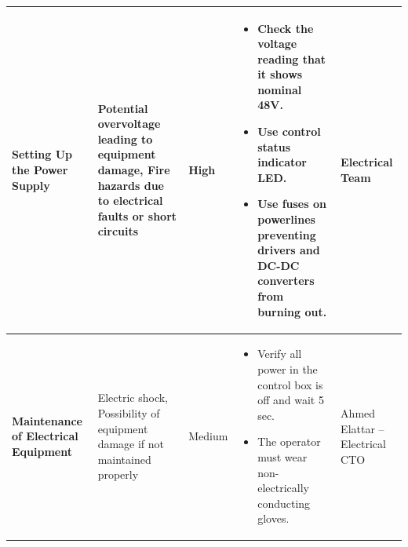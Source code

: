 \documentclass[conference , 12pt]{IEEEtran}
\begin{document}
\begin{longtable}{|p{3.5cm}|>{\raggedright}p{3.5cm}|p{1.5cm}|>{\raggedright}p{5cm}|p{3cm}|}
    \hline
    \textbf{Setting Up the Power Supply}                                                                                                                                           &
    Potential overvoltage leading to equipment damage, Fire hazards due to electrical faults or short circuits                                                                     &
    High                                                                                                                                                                           &
    \begin{itemize}[leftmargin=*]
        \item Check the voltage reading that it shows nominal 48V.
        \item Use control status indicator LED.
        \item Use fuses on powerlines preventing drivers and DC-DC converters from burning
              out.
    \end{itemize}                                                                                             &
    Electrical Team                                                                                                                                                                                                                                                                       \\

    \hline
    \textbf{Maintenance of Electrical Equipment}                                                                                                                                   &
    Electric shock, Possibility of equipment damage if not maintained properly                                                                                                     &
    Medium                                                                                                                                                                         &
    \begin{itemize}[leftmargin=*]
        \item Verify all power in the control box is off and wait 5 sec.
        \item The operator must wear non-electrically conducting gloves.
    \end{itemize}                                                                                                               &
    Ahmed Elattar – Electrical CTO                                                                                                                                                                                                                                                        \\


\end{longtable}
\end{document}
